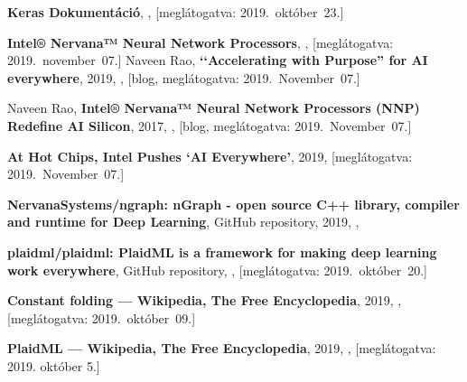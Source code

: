 \begin{thebibliography}{9}
	\textbf{Keras Dokumentáció},
	,
	[meglátogatva: 2019.~október~23.]

	\textbf{Intel® Nervana™ Neural Network Processors},
	,
	[meglátogatva: 2019.~november~07.]
	Naveen Rao,
	\textbf{‘‘Accelerating with Purpose'' for AI everywhere},
	2019,
	,
	[blog, meglátogatva: 2019.~November~07.]

	Naveen Rao,
	\textbf{Intel® Nervana™ Neural Network Processors (NNP) Redefine AI Silicon},
	2017,
	,
	[blog, meglátogatva: 2019.~November~07.]

	\textbf{At Hot Chips, Intel Pushes ‘AI Everywhere’},
	2019,
	[meglátogatva: 2019.~November~07.]


	\textbf{NervanaSystems/ngraph: nGraph - open source C++ library, compiler and runtime for Deep Learning},
	GitHub repository,
	2019,
	,

	\textbf{plaidml/plaidml: PlaidML is a framework for making deep learning work everywhere},
	GitHub repository,
	,
	[meglátogatva: 2019.~október~20.]


	\textbf{Constant folding --- {Wikipedia}{,} The Free Encyclopedia},
	2019,
	,
	[meglátogatva: 2019.~október~09.]
	
	\textbf{PlaidML --- {Wikipedia}{,} The Free Encyclopedia},
	2019,
	,
	[meglátogatva: 2019. október 5.]
	

\end{thebibliography}
